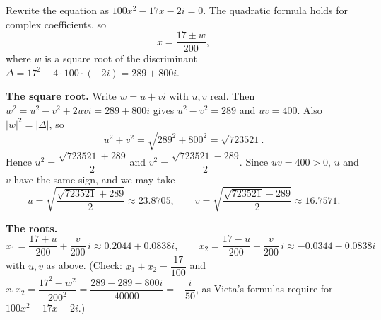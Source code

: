 Rewrite the equation as $100x^2-17x-2i=0$. The quadratic formula holds for complex coefficients, so
\[x=\dfrac{17\pm w}{200},\]
where $w$ is a square root of the discriminant $\Delta=17^2-4\cdot100\cdot(-2i)=289+800i$.

\textbf{The square root.} Write $w=u+vi$ with $u,v$ real. Then $w^2=u^2-v^2+2uvi=289+800i$ gives $u^2-v^2=289$ and $uv=400$. Also $|w|^2=|\Delta|$, so
\[u^2+v^2=\sqrt{289^2+800^2}=\sqrt{723521}.\]
Hence $u^2=\dfrac{\sqrt{723521}+289}{2}$ and $v^2=\dfrac{\sqrt{723521}-289}{2}$. Since $uv=400>0$, $u$ and $v$ have the same sign, and we may take
\[u=\sqrt{\dfrac{\sqrt{723521}+289}{2}}\approx23.8705,\qquad v=\sqrt{\dfrac{\sqrt{723521}-289}{2}}\approx16.7571.\]

\textbf{The roots.}
\[\boxed{x_1=\dfrac{17+u}{200}+\dfrac{v}{200}\,i\approx0.2044+0.0838i,\qquad x_2=\dfrac{17-u}{200}-\dfrac{v}{200}\,i\approx-0.0344-0.0838i}\]
with $u,v$ as above. (Check: $x_1+x_2=\dfrac{17}{100}$ and $x_1x_2=\dfrac{17^2-w^2}{200^2}=\dfrac{289-289-800i}{40000}=-\dfrac{i}{50}$, as Vieta's formulas require for $100x^2-17x-2i$.)
